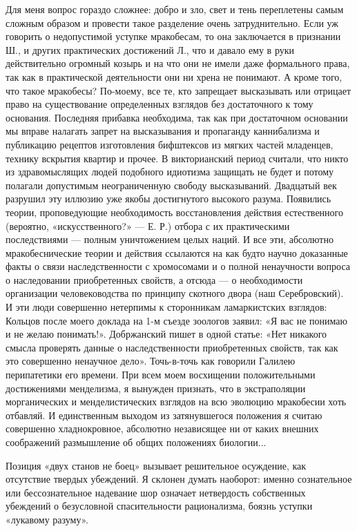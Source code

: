 Для меня вопрос гораздо сложнее: добро и зло, свет и тень переплетены
самым сложным образом и провести такое разделение очень
затруднительно. Если уж говорить о недопустимой уступке мракобесам, то
она заключается в признании Ш., и других практических достижений Л.,
что и давало ему в руки действительно огромный козырь и на что они не
имели даже формального права, так как в практической деятельности они
ни хрена не понимают. А кроме того, что такое мракобесы? По-моему, все
те, кто запрещает высказывать или отрицает право на существование
определенных взглядов без достаточного к тому основания. Последняя
прибавка необходима, так как при достаточном основании мы вправе
налагать запрет на высказывания и пропаганду каннибализма и публикацию
рецептов изготовления бифштексов из мягких частей младенцев, технику
вскрытия квартир и прочее. В викторианский период считали, что никто
из здравомыслящих людей подобного идиотизма защищать не будет и потому
полагали допустимым неограниченную свободу высказываний. Двадцатый век
разрушил эту иллюзию уже якобы достигнутого высокого разума. Появились
теории, проповедующие необходимость восстановления действия
естественного (вероятно, «искусственного?» --- Е. Р.) отбора с их
практическими последствиями --- полным уничтожением целых наций. И все
эти, абсолютно мракобеснические теории и действия ссылаются на как
будто научно доказанные факты о связи наследственности с хромосомами и
о полной ненаучности вопроса о наследовании приобретенных свойств, а
отсюда --- о необходимости организации человеководства по принципу
скотного двора (наш Серебровский). И эти люди совершенно нетерпимы к
сторонникам ламаркистских взглядов: Кольцов после моего доклада на 1-м
съезде зоологов заявил: «Я вас не понимаю и не желаю понимать!».
Добржанский пишет в одной статье: «Нет никакого смысла проверять
данные о наследственности приобретенных свойств, так как это
совершенно ненаучное дело». Точь-в-точь как говорили Галилею
перипатетики его времени. При всем моем восхищении положительными
достижениями менделизма, я вынужден признать, что в экстраполяции
морганических и менделистических взглядов на всю эволюцию мракобесии
хоть отбавляй. И единственным выходом из затянувшегося положения я
считаю совершенно хладнокровное, абсолютно независящее ни от каких
внешних соображений размышление об общих положениях биологии...

Позиция «двух станов не боец» вызывает решительное осуждение, как
отсутствие твердых убеждений. Я склонен думать наоборот: именно
сознательное или бессознательное надевание шор означает нетвердость
собственных убеждений о безусловной спасительности рационализма,
боязнь уступки «лукавому разуму».

